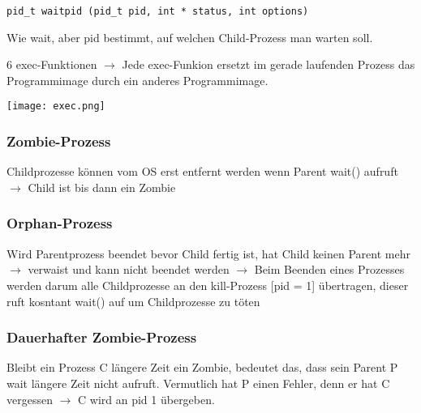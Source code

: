 \begin{multicols*}{5}
		\vspace{-5pt}

		\begin{lstlisting}
pid_t waitpid (pid_t pid, int * status, int options)
		\end{lstlisting}
		\vspace{-5pt}
		\begin{compactitem}[$\bullet$]
			\item Wie wait, aber pid bestimmt, auf welchen Child-Prozess man warten soll.
		\end{compactitem}
		
		\vspace{-2pt}

		\drule{\linewidth}{1pt}
	
		6 \textcolor{h}{exec-Funktionen} $\rightarrow$ Jede exec-Funkion ersetzt im gerade laufenden Prozess das Programmimage durch ein anderes Programmimage.\\

		\vspace{-7pt}

			\begin{center}
				\texttt{[image: exec.png]}
			\end{center}

		\vspace{-7pt}


	\subsubsection{Zombie-Prozess}
	Childprozesse können vom OS erst entfernt werden wenn Parent wait() aufruft $\rightarrow$ Child ist bis dann ein Zombie
			


	\subsubsection{Orphan-Prozess}
	Wird Parentprozess beendet bevor Child fertig ist, hat Child keinen Parent mehr $\rightarrow$ verwaist und kann nicht beendet werden $\rightarrow$ Beim Beenden eines Prozesses werden darum alle Childprozesse an den kill-Prozess [pid = 1] übertragen, dieser ruft kosntant wait() auf um Childprozesse zu töten
		



	\subsubsection{Dauerhafter Zombie-Prozess}
			Bleibt ein Prozess C längere Zeit ein Zombie, bedeutet das, dass sein Parent P wait längere Zeit nicht aufruft. Vermutlich hat P einen Fehler, denn er hat C vergessen $\rightarrow$ C wird an pid 1 übergeben.
	


\end{multicols*}
